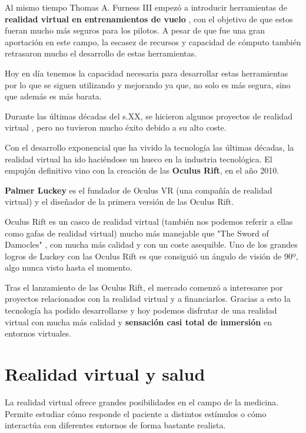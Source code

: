 \documentclass[twoside, 11pt]{epstfg}
\begin{document}
Al mismo tiempo Thomas A. Furness III empezó a introducir herramientas de \textbf{realidad virtual en entrenamientos de vuelo} \cite{kocian1977visually}, con el objetivo de que estos fueran mucho más seguros para los pilotos.
A pesar de que fue una gran aportación en este campo, la escasez de recursos y capacidad de cómputo también retrasaron mucho el desarrollo de estas herramientas.
 
Hoy en día tenemos la capacidad necesaria para desarrollar estas herramientas por lo que se siguen utilizando y mejorando ya que, no solo es más segura, sino que además es más barata.

Durante las últimas décadas del s.XX, se hicieron algunos proyectos de realidad virtual , pero no tuvieron mucho éxito debido a su alto coste.

Con el desarrollo exponencial que ha vivido la tecnología las últimas décadas, la realidad virtual ha ido haciéndose un hueco en la industria tecnológica.
El empujón definitivo vino con la creación de las \textbf{Oculus Rift}, en el año 2010.

\textbf{Palmer Luckey} es el fundador de Oculus VR (una compañía de realidad virtual) y el diseñador de la primera versión de las Oculus Rift.

Oculus Rift es un casco de realidad virtual (también nos podemos referir a ellas como gafas de realidad virtual) mucho más manejable que "The Sword of Damocles" , con mucha más calidad y con un coste asequible.
Uno de los grandes logros de Luckey con las Oculus Rift es que consiguió un ángulo de visión de 90º, algo nunca visto hasta el momento.

Tras el lanzamiento de las Oculus Rift, el mercado comenzó a interesarse por proyectos relacionados con la realidad virtual y a financiarlos.
Gracias a esto la tecnología ha podido desarrollarse y hoy podemos disfrutar de una realidad virtual con mucha más calidad y \textbf{sensación casi total de inmersión} en entornos virtuales.




\section{Realidad virtual y salud}
\label{sec:VR y salud}

La realidad virtual ofrece grandes posibilidades en el campo de la medicina. Permite estudiar cómo responde el paciente a distintos estímulos o cómo interactúa con diferentes entornos de forma bastante realista.
\end{document}
